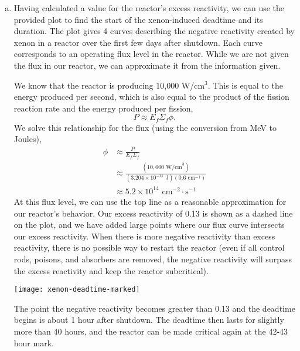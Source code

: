 \begin{enumerate}[a)]
\item Having calculated a value for the reactor's excess reactivity, we can use the provided plot to find the start of the xenon-induced deadtime and its duration. The plot gives 4 curves describing the negative reactivity created by xenon in a reactor over the first few days after shutdown. Each curve corresponds to an operating flux level in the reactor. While we are not given the flux in our reactor, we can approximate it from the information given. 

We know that the reactor is producing 10,000 W/cm$^3$. This is equal to the energy produced per second, which is also equal to the product of the fission reaction rate and the energy produced per fission,
$$ P \approx E_f \Sigma_f \phi .$$
We solve this relationship for the flux (using the conversion from MeV to Joules),
\begin{align*}
\phi	&\approx \frac{P}{E_f \Sigma_f} \\
		&\approx \frac{\left(10,000\text{ W/cm}^3\right)}{\left(3.204\times10^{-11}\text{ J}\right)\left(0.6\text{ cm}^{-1}\right)} \\
		&\approx 5.2\times10^{14}\text{ cm}^{-2}\cdot\text{s}^{-1}
\end{align*}
At this flux level, we can use the top line as a reasonable approximation for our reactor's behavior. Our excess reactivity of 0.13 is shown as a dashed line on the plot, and we have added large points where our flux curve intersects our excess reactivity. When there is more negative reactivity than excess reactivity, there is no possible way to restart the reactor (even if all control rods, poisons, and absorbers are removed, the negative reactivity will surpass the excess reactivity and keep the reactor subcritical). 

\texttt{[image: xenon-deadtime-marked]}

The point the negative reactivity becomes greater than 0.13 and the deadtime begins is about 1 hour after shutdown. The deadtime then lasts for slightly more than 40 hours, and the reactor can be made critical again at the 42-43 hour mark.


\end{enumerate}

